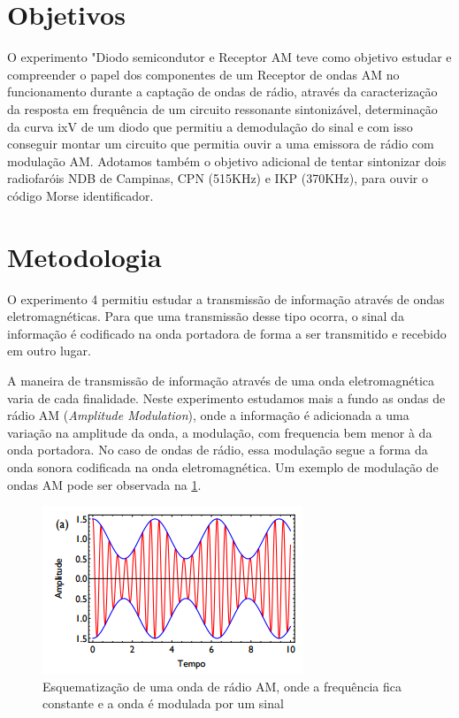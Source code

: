 \documentclass[11pt,a4paper]{article}
\begin{document}
\section{Objetivos}

    O experimento "Diodo semicondutor e Receptor AM teve como objetivo estudar e compreender o papel dos componentes de um Receptor de ondas AM no funcionamento durante a captação de ondas de rádio, através da caracterização da resposta em frequência de um circuito ressonante sintonizável, determinação da curva ixV de um diodo que permitiu a demodulação do sinal e com isso conseguir montar um circuito que permitia ouvir a uma emissora de rádio com modulação AM. Adotamos também o objetivo adicional de tentar sintonizar dois radiofaróis NDB de Campinas, CPN (515KHz) e IKP (370KHz), para ouvir o código Morse identificador.
    
\section{Metodologia}
    
    O experimento 4 permitiu estudar a transmissão de informação através de ondas eletromagnéticas. Para que uma transmissão desse tipo ocorra, o sinal da informação é codificado na onda portadora de forma a ser transmitido e recebido em outro lugar.
    
    A maneira de transmissão de informação através de uma onda eletromagnética varia de cada finalidade. Neste experimento estudamos mais a fundo as ondas de rádio AM (\textit{Amplitude Modulation}), onde a informação é adicionada a uma variação na amplitude da onda, a modulação, com frequencia bem menor à da onda portadora. No caso de ondas de rádio, essa modulação segue a forma da onda sonora codificada na onda eletromagnética. Um exemplo de modulação de ondas AM pode ser observada na \cref{OndasAM}.
    
        \begin{figure}[!htb]
        \centering
        \includegraphics[scale=0.7]{OndasAM.png}
        \caption{Esquematização de uma onda de rádio AM, onde a frequência fica constante e a onda é modulada por um sinal}
        \label{OndasAM}
        \end{figure}
        
\end{document}
